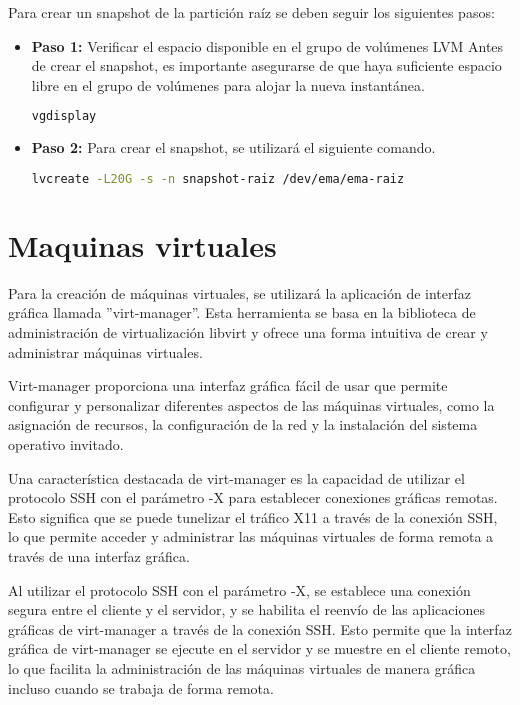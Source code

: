 	Para crear un snapshot de la partición raíz se deben seguir los siguientes pasos:
	
	\begin{itemize}
		\item \textbf{Paso 1:} Verificar el espacio disponible en el grupo de volúmenes LVM
		Antes de crear el snapshot, es importante asegurarse de que haya suficiente espacio libre en el grupo de volúmenes para alojar la nueva instantánea.
		\begin{lstlisting}[language=Bash, caption=vgdisplay]
		vgdisplay
		\end{lstlisting}
			
		\item\textbf{Paso 2:} Para crear el snapshot, se utilizará el siguiente comando.
		\begin{lstlisting}[language=Bash, caption=snapshot]
		lvcreate -L20G -s -n snapshot-raiz /dev/ema/ema-raiz
		\end{lstlisting}
				
		\end{itemize}

			
		\section{Maquinas virtuales}
		
		Para la creación de máquinas virtuales, se utilizará la aplicación de interfaz gráfica llamada ''virt-manager''. Esta herramienta se basa en la biblioteca de administración de virtualización libvirt y ofrece una forma intuitiva de crear y administrar máquinas virtuales.\par
		
		Virt-manager proporciona una interfaz gráfica fácil de usar que permite configurar y personalizar diferentes aspectos de las máquinas virtuales, como la asignación de recursos, la configuración de la red y la instalación del sistema operativo invitado.\par
		
		Una característica destacada de virt-manager es la capacidad de utilizar el protocolo SSH con el parámetro -X para establecer conexiones gráficas remotas. Esto significa que se puede tunelizar el tráfico X11 a través de la conexión SSH, lo que permite acceder y administrar las máquinas virtuales de forma remota a través de una interfaz gráfica.\par
		
		Al utilizar el protocolo SSH con el parámetro -X, se establece una conexión segura entre el cliente y el servidor, y se habilita el reenvío de las aplicaciones gráficas de virt-manager a través de la conexión SSH. Esto permite que la interfaz gráfica de virt-manager se ejecute en el servidor y se muestre en el cliente remoto, lo que facilita la administración de las máquinas virtuales de manera gráfica incluso cuando se trabaja de forma remota.\par
		
